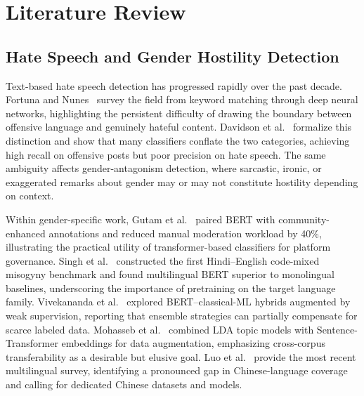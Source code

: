 ﻿\documentclass[12pt]{article}
\begin{document}
\section{Literature Review}

\subsection{Hate Speech and Gender Hostility Detection}
Text-based hate speech detection has progressed rapidly over the past decade. Fortuna and Nunes~\cite{fortuna2018survey} survey the field from keyword matching through deep neural networks, highlighting the persistent difficulty of drawing the boundary between offensive language and genuinely hateful content. Davidson et al.~\cite{davidson2017offensive} formalize this distinction and show that many classifiers conflate the two categories, achieving high recall on offensive posts but poor precision on hate speech. The same ambiguity affects gender-antagonism detection, where sarcastic, ironic, or exaggerated remarks about gender may or may not constitute hostility depending on context.

Within gender-specific work, Gutam et al.~\cite{gutam2025feminist} paired BERT with community-enhanced annotations and reduced manual moderation workload by 40\%, illustrating the practical utility of transformer-based classifiers for platform governance. Singh et al.~\cite{singh2025misogynistic} constructed the first Hindi--English code-mixed misogyny benchmark and found multilingual BERT superior to monolingual baselines, underscoring the importance of pretraining on the target language family. Vivekananda et al.~\cite{vivekananda2025integrating} explored BERT--classical-ML hybrids augmented by weak supervision, reporting that ensemble strategies can partially compensate for scarce labeled data. Mohasseb et al.~\cite{mohasseb2025leveraging} combined LDA topic models with Sentence-Transformer embeddings for data augmentation, emphasizing cross-corpus transferability as a desirable but elusive goal. Luo et al.~\cite{luo2025survey} provide the most recent multilingual survey, identifying a pronounced gap in Chinese-language coverage and calling for dedicated Chinese datasets and models.
\end{document}
